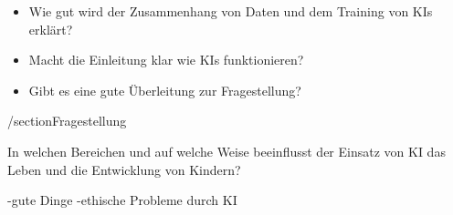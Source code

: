 \documentclass{article}
\begin{document}
\begin{itemize}
    \item Wie gut wird der Zusammenhang von Daten und dem Training von KIs erklärt?
    \item Macht die Einleitung klar wie KIs funktionieren?
    \item Gibt es eine gute Überleitung zur Fragestellung?

\end{itemize}

/section{Fragestellung}

In welchen Bereichen und auf welche Weise beeinflusst der Einsatz von KI das Leben und die Entwicklung von Kindern?

-gute Dinge
-ethische Probleme durch KI 



\printbibliography
\end{document}
